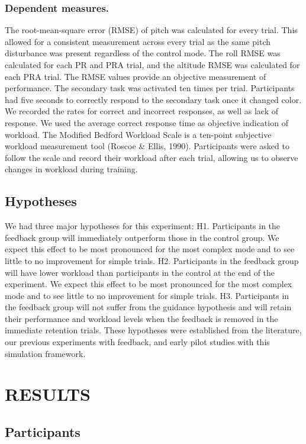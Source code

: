 \subsubsection{Dependent measures.}
The root-mean-square error (RMSE) of pitch was calculated for every trial.
This allowed for a consistent measurement across every trial as the same pitch disturbance was present regardless of the control mode.
The roll RMSE was calculated for each PR and PRA trial, and the altitude RMSE was calculated for each PRA trial.
The RMSE values provide an objective measurement of performance.
The secondary task was activated ten times per trial.
Participants had five seconds to correctly respond to the secondary task once it changed color.
We recorded the rates for correct and incorrect responses, as well as lack of response.
We used the average correct response time as objective indication of workload.
The Modified Bedford Workload Scale is a ten-point subjective workload measurement tool (Roscoe \& Ellis, 1990).
Participants were asked to follow the scale and record their workload after each trial, allowing us to observe changes in workload during training.

\subsection{Hypotheses}

We had three major hypotheses for this experiment:
H1.	Participants in the feedback group will immediately outperform those in the control group. We expect this effect to be most pronounced for the most complex mode and to see little to no improvement for simple trials.
H2.	Participants in the feedback group will have lower workload than participants in the control at the end of the experiment. We expect this effect to be most pronounced for the most complex mode and to see little to no improvement for simple trials.
H3.	Participants in the feedback group will not suffer from the guidance hypothesis and will retain their performance and workload levels when the feedback is removed in the immediate retention trials.
These hypotheses were established from the literature, our previous experiments with feedback, and early pilot studies with this simulation framework.

\section{RESULTS}

\subsection{Participants}

